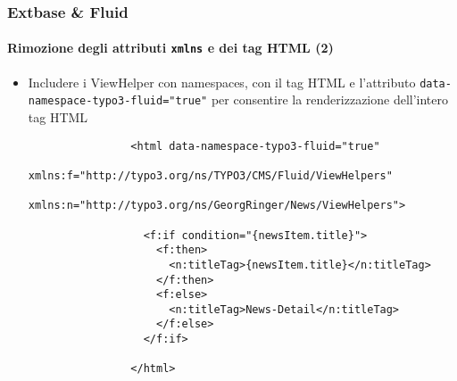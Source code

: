 \begin{frame}[fragile]
	\frametitle{Extbase \& Fluid}
	\framesubtitle{Rimozione degli attributi \texttt{xmlns} e dei tag HTML (2)}

	\lstset{basicstyle=\tiny\ttfamily}

	\begin{itemize}

		\item Includere i ViewHelper con namespaces, con il tag HTML e l'attributo
			\texttt{data-namespace-typo3-fluid="true"} per consentire la renderizzazione
			dell'intero tag HTML

			\begin{lstlisting}
				<html data-namespace-typo3-fluid="true"
				  xmlns:f="http://typo3.org/ns/TYPO3/CMS/Fluid/ViewHelpers"
				  xmlns:n="http://typo3.org/ns/GeorgRinger/News/ViewHelpers">

				  <f:if condition="{newsItem.title}">
				    <f:then>
				      <n:titleTag>{newsItem.title}</n:titleTag>
				    </f:then>
				    <f:else>
				      <n:titleTag>News-Detail</n:titleTag>
				    </f:else>
				  </f:if>

				</html>
			\end{lstlisting}

	\end{itemize}

\end{frame}


